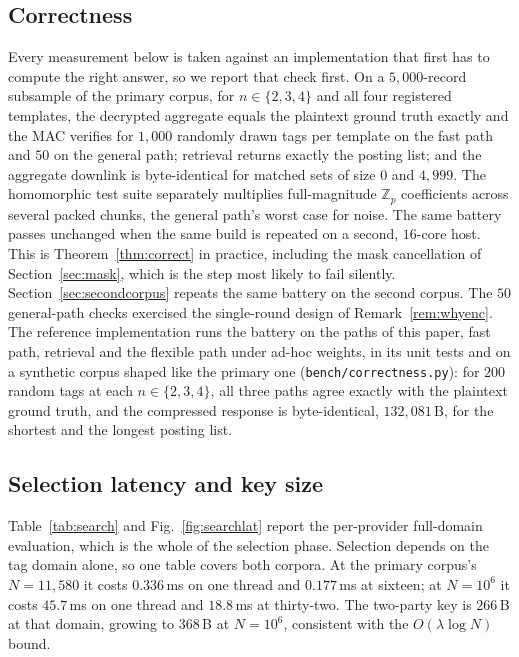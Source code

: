 \documentclass[a4paper,fleqn]{cas-sc}
\newif\ifauthorchecks
\newcommand{\authorcheck}[1]{\ifauthorchecks{\color{red}\textsf{[Authors: #1]}}\fi}
\begin{document}
\subsection{Correctness}
\label{sec:correctness}
Every measurement below is taken against an implementation that first has to
compute the right answer, so we report that check first. On a
$5{,}000$-record subsample of the primary corpus, for $n\in\{2,3,4\}$ and all
four registered templates, the decrypted aggregate equals the plaintext ground
truth exactly and the MAC verifies for $1{,}000$ randomly drawn tags per
template on the fast path and $50$ on the general path; retrieval returns
exactly the posting list; and the aggregate downlink is byte-identical for
matched sets of size $0$ and $4{,}999$. The homomorphic test suite separately
multiplies full-magnitude $\mathbb{Z}_p$ coefficients across several packed
chunks, the general path's worst case for noise. The same battery passes
unchanged when the same build is repeated on a second, $16$-core host. This is Theorem~\ref{thm:correct} in practice, including the mask
cancellation of Section~\ref{sec:mask}, which is the step most likely to fail
silently. Section~\ref{sec:secondcorpus} repeats the same battery on the
second corpus. The $50$ general-path checks exercised the
single-round design of Remark~\ref{rem:whyenc}. The reference implementation
runs the battery on the paths of this paper, fast path, retrieval and the
flexible path under ad-hoc weights, in its unit tests and on a synthetic
corpus shaped like the primary one (\texttt{bench/correctness.py}): for $200$
random tags at each $n\in\{2,3,4\}$, all three paths agree exactly with the
plaintext ground truth, and the compressed response is byte-identical,
$132{,}081$\,B, for the shortest and the longest posting list.
\authorcheck{Run bench/correctness.py on both real corpora (it needs the raw
files, see data/README.md) and report the counts here.}

\subsection{Selection latency and key size}
Table~\ref{tab:search} and Fig.~\ref{fig:searchlat} report the per-provider
full-domain evaluation, which is the whole of the selection phase. Selection
depends on the tag domain alone, so one table covers both corpora. At the
primary corpus's $N=11{,}580$ it costs $0.336$\,ms on one thread and
$0.177$\,ms at sixteen; at $N=10^6$ it costs $45.7$\,ms on one thread and
$18.8$\,ms at thirty-two. The two-party key is $266$\,B at that domain,
growing to $368$\,B at $N=10^6$, consistent with the $O(\lambda\log N)$ bound.
\end{document}
